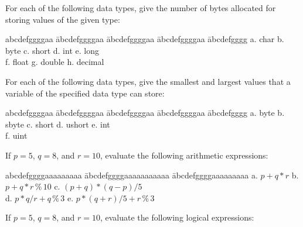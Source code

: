 {\begin{list}{E \thechapter.\theenumi}

\item For each of the following data types, give the number of
bytes allocated for storing values of the given type:



\begin{tabbing}
abcdefggggaa \= abcdefggggaa \= abcdefggggaa \= abcdefggggaa \=
abcdefgggg
 \kill
  a. char \> b. byte \> c. short \> d. int \> e. long \\
  f. float \> g. double \> h. decimal \>  \>
\end{tabbing}


\item For each of the following data types, give the smallest and
largest values that a variable of the specified data type can
store:


\begin{tabbing}
abcdefggggaa \= abcdefggggaa \= abcdefggggaa \= abcdefggggaa \=
abcdefgggg
 \kill
  a. byte \> b. sbyte \> c. short \> d. ushort \> e. int \\
  f. uint \>  \>  \>  \>
\end{tabbing}



\item If $p = 5$, $q = 8$, and $r = 10$, evaluate the following
arithmetic expressions:


\begin{tabbing}
abcdefggggaaaaaaaaa \= abcdefggggaaaaaaaaaaa \=
abcdefggggaaaaaaaaa \kill
  a. $p + q \ast r$ \> b. $p + q \ast r \,\%\, 10$ \> c. $(p + q) \ast (q - p) / 5$ \\
  d. $p \ast q / r + q \,\%\, 3$ \> e. $p \ast (q + r) / 5 + r \,\%\, 3$ \>
\end{tabbing}



\item If $p = 5$, $q = 8$, and $r = 10$, evaluate the following
logical expressions:


\end{list}}
